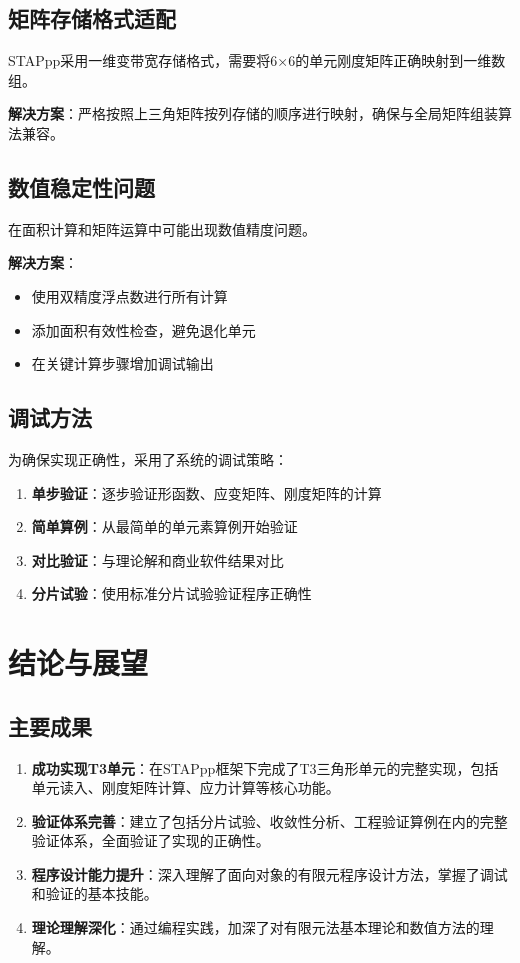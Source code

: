 \documentclass[12pt,a4paper]{article}
\begin{document}
\subsection{矩阵存储格式适配}

STAPpp采用一维变带宽存储格式，需要将6×6的单元刚度矩阵正确映射到一维数组。

\textbf{解决方案}：严格按照上三角矩阵按列存储的顺序进行映射，确保与全局矩阵组装算法兼容。

\subsection{数值稳定性问题}

在面积计算和矩阵运算中可能出现数值精度问题。

\textbf{解决方案}：
\begin{itemize}
    \item 使用双精度浮点数进行所有计算
    \item 添加面积有效性检查，避免退化单元
    \item 在关键计算步骤增加调试输出
\end{itemize}

\subsection{调试方法}

为确保实现正确性，采用了系统的调试策略：

\begin{enumerate}
    \item \textbf{单步验证}：逐步验证形函数、应变矩阵、刚度矩阵的计算
    \item \textbf{简单算例}：从最简单的单元素算例开始验证
    \item \textbf{对比验证}：与理论解和商业软件结果对比
    \item \textbf{分片试验}：使用标准分片试验验证程序正确性
\end{enumerate}

\section{结论与展望}

\subsection{主要成果}

\begin{enumerate}
    \item \textbf{成功实现T3单元}：在STAPpp框架下完成了T3三角形单元的完整实现，包括单元读入、刚度矩阵计算、应力计算等核心功能。

    \item \textbf{验证体系完善}：建立了包括分片试验、收敛性分析、工程验证算例在内的完整验证体系，全面验证了实现的正确性。

    \item \textbf{程序设计能力提升}：深入理解了面向对象的有限元程序设计方法，掌握了调试和验证的基本技能。

    \item \textbf{理论理解深化}：通过编程实践，加深了对有限元法基本理论和数值方法的理解。
\end{enumerate}
\end{document}
